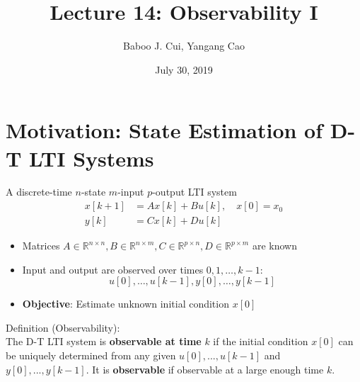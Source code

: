 \documentclass[10pt,a4paper,oneside]{article}
\date{July 30, 2019}
\author{Baboo J. Cui, Yangang Cao}
\title{Lecture 14: Observability I}
\begin{document}
\maketitle
\tableofcontents
\newpage
\section{Motivation: State Estimation of D-T LTI Systems}
A discrete-time $n$-state $m$-input $p$-output LTI system
\[
\begin{aligned} x[k+1] &=A x[k]+B u[k], \quad x[0]=x_{0} \\ y[k] &=C x[k]+D u[k] \end{aligned}
\]
\begin{itemize}
\item Matrices $A \in \mathbb{R}^{n \times n}, B \in \mathbb{R}^{n \times m}, C \in \mathbb{R}^{p \times n}, D \in \mathbb{R}^{p \times m}$ are known
\item Input and output are observed over times $0,1, \ldots, k-1$:
\[
u[0], \ldots, u[k-1], y[0], \ldots, y[k-1]
\]
\item {\bfseries Objective}: Estimate unknown initial condition $x[0]$
\end{itemize}
Definition (Observability):\\
The D-T LTI system is {\bfseries observable at time} $k$ if the initial condition $x[0]$ can be uniquely determined from any given $u[0],...,u[k-1]$ and $y[0],...,y[k-1]$. It is {\bfseries observable} if observable at a large enough time $k$.
\end{document}
